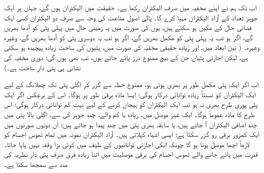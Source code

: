  اب تک ہم نے اپنے مخفیہ میں صرف  الیکٹران رکھا ہے۔ حقیقت میں  الیکٹران ہوں گے، جہاں ہر ایک جوہر  تعداد کے آزاد الیکٹران مہیا کرے گا۔ پالی اصول مناعت کی وجہ سے  صرف دو الیکٹران کسی ایک فضائی حال کے مکین ہو سکتے ہیں، یوں  کی صورت میں یہ زمینی حال میں پہلی پٹی کو آدھا بھریں گے، اگر  ہو تب یہ پہلی پٹی کو مکمل بھریں گے، اگر  ہو تب یہ دوسری پٹی کو آدھا بھریں گے، وغیرہ وغیرہ۔ ( تین ابعاد میں، اور زیادہ حقیقی مخفیہ کی صورت میں، پٹیوں کی ساخت زیادہ پیچیدہ ہو سکتی ہے، لیکن اجازتی پٹیاں جن کے بیچ ممنوع درز پائے جاتے ہوں، تب بھی ہوں گی؛ دوری مخفیہ کی نشانی ہی پٹی دار ساخت ہے۔)
 
 اب اگر ایک پٹی مکمل طور پر بھری ہوئی ہو، ممنوع خطہ سے گزر کر اگلی پٹی تک چھلانگ کے لیے ایک الیکٹران کو نسبتاً زیادہ توانائی درکار ہوگی؛ ایسا مادّہ برقی طور پر  ہوگا۔ اس کے برعکس اگر ایک پٹی پوری طرح بھری نہ ہو تب ایک الیکٹران کو ہیجان کرنے کے لیے بہت کم توانائی درکار ہوگی؛ اس طرح کا مادّہ عموماً  ہوگا۔ ایک غیر موصل میں، زیادہ یا کم  والے، چند جوہر کی سے، اگلی بالا پٹی میں چند اضافی الیکٹران آ جاتے ہیں، یا سابقہ بھری پٹی میں چند  پیدا ہو جاتے ہیں؛ ان دونوں صورتوں میں ایک کمزور برقی رو گزر سکتا ہے؛ ایسی اشیاء  کہلاتی ہیں۔ آزاد الیکٹران نمونہ میں تمام ٹھوس اجسام کو لازماً اچھا موصل ہونا ہو گا چونکہ انکی اجازتی توانائیوں کے طیف میں کوئی بڑا وقفہ نہیں پایا جاتا۔ قدرت میں پائے جانے والے ٹھوس اجسام کی برقی موصلیت میں اتنا زیادہ فرق صرف پٹی دار نظریہ کی مدد سے سمجھا سکتا ہے۔ 


